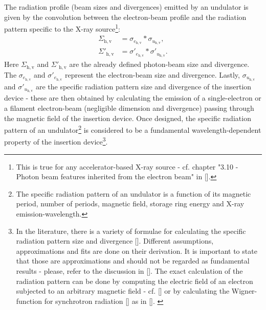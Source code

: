 \begin{refsection}
The radiation profile (beam sizes and divergences) emitted by an undulator is given by the convolution between the electron-beam profile and the radiation pattern specific to the X-ray source\footnote{This is true for any accelerator-based X-ray source - cf. chapter "3.10 - Photon beam features inherited from the electron beam" in [\cite{Talman2006}].}: 
\begin{subequations}\label{eq:undulator}
    \begin{align}   
    \Sigma_{\mathrm{h,v}} &= \sigma_{e_{\mathrm{h,v}}}*\sigma_{u_{\mathrm{h,v}}},\\
    \Sigma'_{\mathrm{h,v}} &= \sigma'_{e_{\mathrm{h,v}}}*\sigma'_{u_{\mathrm{h,v}}}.
    \end{align}
\end{subequations}{}
Here $\Sigma_{\mathrm{h,v}}$ and $\Sigma'_{\mathrm{h,v}}$ are the already defined photon-beam size and divergence. The $\sigma_{e_{\mathrm{h,v}}}$ and $\sigma'_{e_{\mathrm{h,v}}}$ represent the electron-beam size and divergence. Lastly, $\sigma_{u_{\mathrm{h,v}}}$ and $\sigma'_{u_{\mathrm{h,v}}}$ are the specific radiation pattern size and divergence of the insertion device - these are then obtained by calculating the emission of a single-electron or a filament electron-beam (negligible dimension and divergence) passing through the magnetic field of the insertion device. Once designed, the specific radiation pattern of an undulator\footnote{The specific radiation pattern of an undulator is a function of its magnetic period, number of periods, magnetic field, storage ring energy and X-ray emission-wavelength.} is considered to be a fundamental wavelength-dependent property of the insertion device\footnote{In the literature, there is a variety of formulae for calculating the specific radiation pattern size and divergence [\cite{Kim1986, Kim1989, Tanaka2009, Elleaume2013}]. Different assumptions, approximations and fits are done on their derivation. It is important to state that those are approximations and should not be regarded as fundamental results - please, refer to the discussion in [\cite{Walker2019}]. The exact calculation of the radiation pattern can be done by computing the electric field of an electron subjected to an arbitrary magnetic field - cf. [\cite{Chubar1995, Chubar2001}] or by calculating the Wigner-function for synchrotron radiation [\cite{Bazarov2012}] as in [\cite{Tanaka2014}]. \label{note:und_prof}}.


\end{refsection}
